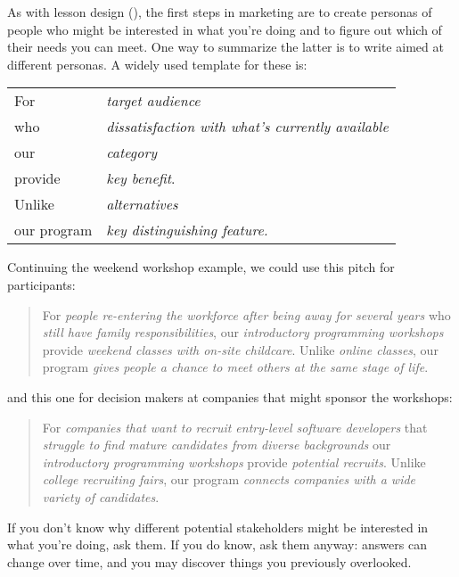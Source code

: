 As with lesson design (),
the first steps in marketing are
to create personas
of people who might be interested in what you're doing
and to figure out which of their needs you can meet.
One way to summarize the latter is to write 
aimed at different personas.
A widely used template for these is:

\newpage
\begin{longtable}{ll}
  For 		& \emph{target audience} \\
  who 		& \emph{dissatisfaction with what's currently available} \\
  our 		& \emph{category} \\
  provide 	& \emph{key benefit}. \\
  Unlike 	& \emph{alternatives} \\
  our program 	& \emph{key distinguishing feature.}
\end{longtable}

\noindent
Continuing the weekend workshop example,
we could use this pitch for participants:

\begin{quote}

  For \emph{people re-entering the workforce after being away for several years}
  who \emph{still have family responsibilities},
  our \emph{introductory programming workshops}
  provide \emph{weekend classes with on-site childcare}.
  Unlike \emph{online classes},
  our program \emph{gives people a chance to meet others at the same stage of life}.

\end{quote}

\noindent
and this one for decision makers at companies that might sponsor the workshops:

\begin{quote}

  For \emph{companies that want to recruit entry-level software developers}
  that \emph{struggle to find mature candidates from diverse backgrounds}
  our \emph{introductory programming workshops}
  provide \emph{potential recruits}.
  Unlike \emph{college recruiting fairs},
  our program \emph{connects companies with a wide variety of candidates}.

\end{quote}

If you don't know why different potential stakeholders might be interested in what you're doing,
ask them.
If you do know,
ask them anyway:
answers can change over time,
and you may discover things you previously overlooked.

